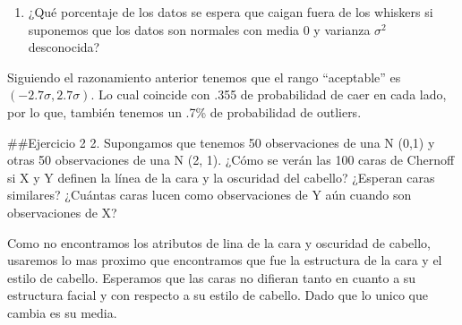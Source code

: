 \documentclass[]{article}
\providecommand{\tightlist}{%
  \setlength{\itemsep}{0pt}\setlength{\parskip}{0pt}}
\begin{document}
\begin{enumerate}
\def\labelenumi{\alph{enumi})}
\setcounter{enumi}{3}
\tightlist
\item
  ¿Qué porcentaje de los datos se espera que caigan fuera de los
  whiskers si suponemos que los datos son normales con media 0 y
  varianza \(\sigma^2\) desconocida?
\end{enumerate}

Siguiendo el razonamiento anterior tenemos que el rango ``aceptable'' es
\((-2.7\sigma,2.7\sigma)\). Lo cual coincide con .355 de probabilidad de
caer en cada lado, por lo que, también tenemos un .7\% de probabilidad
de outliers.

\#\#Ejercicio 2 2. Supongamos que tenemos 50 observaciones de una N
(0,1) y otras 50 observaciones de una N (2, 1). ¿Cómo se verán las 100
caras de Chernoff si X y Y definen la línea de la cara y la oscuridad
del cabello? ¿Esperan caras similares? ¿Cuántas caras lucen como
observaciones de Y aún cuando son observaciones de X?

Como no encontramos los atributos de lina de la cara y oscuridad de
cabello, usaremos lo mas proximo que encontramos que fue la estructura
de la cara y el estilo de cabello. Esperamos que las caras no difieran
tanto en cuanto a su estructura facial y con respecto a su estilo de
cabello. Dado que lo unico que cambia es su media.
\end{document}
